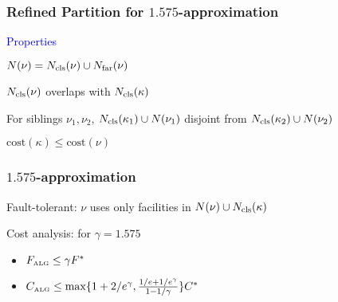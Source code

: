 \documentclass[handout, hyperref, dvipsnames]{beamer}
\begin{document}
\begin{frame}
  \frametitle{Refined Partition for $1.575$-approximation}
  {\Large \textcolor{blue}{
  Properties}}

\vspace{.3in}
  \begin{itemize}\addtolength{\itemsep}{1\baselineskip}
    \large{
  \item $N(\nu)= N_{{\mbox{\scriptsize\rm cls}}}(\nu) \cup N_{{\mbox{\scriptsize\rm far}}}(\nu)$
  \item $N_{{\mbox{\scriptsize\rm cls}}}(\nu)$ overlaps with $N_{{\mbox{\scriptsize\rm cls}}}(\kappa)$
  \item For siblings $\nu_1, \nu_2$, $N_{{\mbox{\scriptsize\rm cls}}}(\kappa_1) \cup
    N(\nu_1)$ disjoint from $N_{{\mbox{\scriptsize\rm cls}}}(\kappa_2) \cup
    N(\nu_2)$
  \item $\text{cost}(\kappa) \leq \text{cost}(\nu)$
}
  \end{itemize}
\end{frame}


\begin{frame}
  \frametitle{$1.575$-approximation}

  \begin{itemize}\addtolength{\itemsep}{1\baselineskip}
    \large{
  \item Fault-tolerant: $\nu$ uses only facilities in
    $N(\nu) \cup N_{{\mbox{\scriptsize\rm cls}}}(\kappa)$
  \item Cost analysis: for $\gamma = 1.575$
    \begin{itemize}
    \item $F_{\mbox{\tiny\rm ALG}} \leq \gamma F^\ast$
    \item $C_{\mbox{\tiny\rm ALG}} \leq \max\{1+2/e^\gamma, \frac{1/e+1/e^\gamma}{1-1/\gamma}\} C^\ast$
    \end{itemize}
}
  \end{itemize}
\end{frame}
\end{document}
